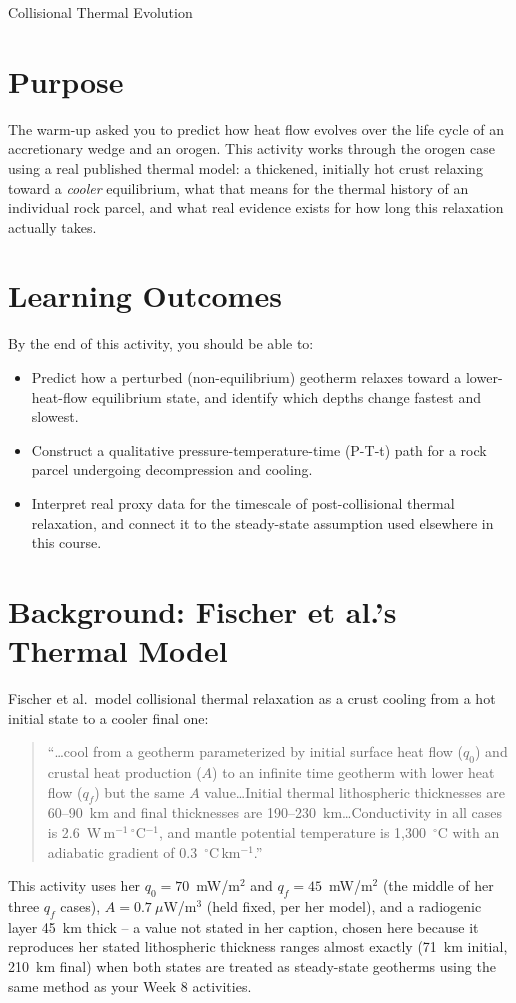\begin{activity}{Collisional Thermal Evolution}

\section*{Purpose}
The warm-up asked you to predict how heat flow evolves over the life cycle of an accretionary wedge and an orogen. This activity works through the orogen case using a real published thermal model: a thickened, initially hot crust relaxing toward a \emph{cooler} equilibrium, what that means for the thermal history of an individual rock parcel, and what real evidence exists for how long this relaxation actually takes.

\section*{Learning Outcomes}
By the end of this activity, you should be able to:
\begin{itemize}
  \item Predict how a perturbed (non-equilibrium) geotherm relaxes toward a lower-heat-flow equilibrium state, and identify which depths change fastest and slowest.
  \item Construct a qualitative pressure-temperature-time (P-T-t) path for a rock parcel undergoing decompression and cooling.
  \item Interpret real proxy data for the timescale of post-collisional thermal relaxation, and connect it to the steady-state assumption used elsewhere in this course.
\end{itemize}

\section*{Background: Fischer et al.'s Thermal Model}

Fischer et al.\ model collisional thermal relaxation as a crust cooling from a hot initial state to a cooler final one:
\begin{quote}
\small ``\ldots cool from a geotherm parameterized by initial surface heat flow ($q_0$) and crustal heat production ($A$) to an infinite time geotherm with lower heat flow ($q_f$) but the same $A$ value\ldots Initial thermal lithospheric thicknesses are 60--90~km and final thicknesses are 190--230~km\ldots Conductivity in all cases is 2.6~W\,m$^{-1}\,^\circ$C$^{-1}$, and mantle potential temperature is 1{,}300~$^\circ$C with an adiabatic gradient of 0.3~$^\circ$C\,km$^{-1}$.''
\end{quote}
This activity uses her $q_0=70$~mW/m$^2$ and $q_f=45$~mW/m$^2$ (the middle of her three $q_f$ cases), $A=0.7\ \mu$W/m$^3$ (held fixed, per her model), and a radiogenic layer 45~km thick -- a value not stated in her caption, chosen here because it reproduces her stated lithospheric thickness ranges almost exactly (71~km initial, 210~km final) when both states are treated as steady-state geotherms using the same method as your Week 8 activities.


\end{activity}
